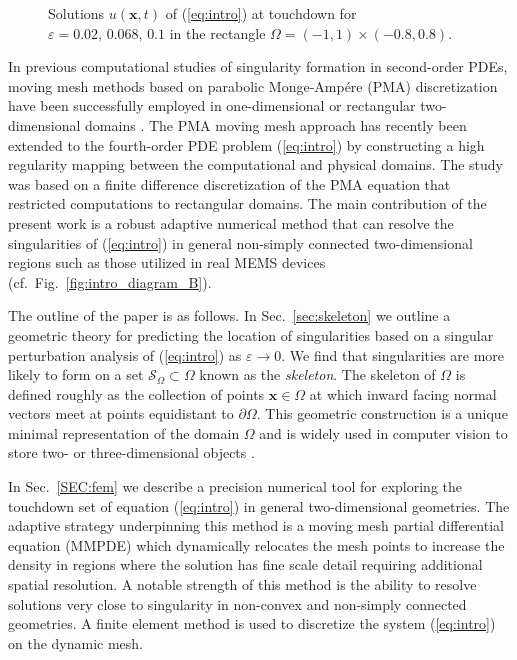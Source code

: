 \documentclass{siamart0516}
\renewcommand{\eqref}[1]{(\ref{#1})}
\newcommand{\eps}{\varepsilon}
\newcommand{\bx}{\mathbf{x}}
\newcommand{\skel}{\mathcal{S}_{\Omega}}
\theoremstyle{plain}%
\theoremstyle{definition}
\theoremstyle{remark}
\begin{document}
 \begin{figure}[htbp]
\centering
\subfigure[$\eps= 0.02$.]{\texttt{[image: rectu1.pdf]} \label{fig:introsol_a}}\quad
\subfigure[$\eps= 0.068$.]{\texttt{[image: rectu2.pdf]} \label{fig:introsol_b}}\quad
\subfigure[$\eps= 0.1$.]{\texttt{[image: rectu3.pdf]} \label{fig:introsol_c}}
\caption{Solutions $u(\bx,t)$ of \eqref{eq:intro} at touchdown for $\eps = 0.02,\, 0.068,\, 0.1$ in the rectangle $\Omega = (-1,1)\times(-0.8,0.8)$. \label{fig:introsol}}
\end{figure}

In previous computational studies of singularity formation in second-order PDEs, moving mesh methods based on parabolic Monge-Amp\'{e}re (PMA) discretization have been successfully employed in one-dimensional \cite{Budd2010} or rectangular two-dimensional domains \cite{Budd2006,Ceniceros2001,PMA2009}. The PMA moving mesh approach has recently \cite{LD2017} been extended to the fourth-order PDE problem \eqref{eq:intro} by constructing a high regularity mapping between the computational and physical domains. The study \cite{LD2017} was based on a finite difference discretization of the PMA equation that restricted computations to rectangular domains. The main contribution of the present work is a robust adaptive numerical method that can resolve the singularities of \eqref{eq:intro} in general non-simply connected two-dimensional regions such as those utilized in real MEMS devices (cf.~Fig.~\ref{fig:intro_diagram_B}).

The outline of the paper is as follows. In Sec.~\ref{sec:skeleton} we outline a geometric theory for predicting the location of singularities based on a singular perturbation analysis of \eqref{eq:intro} as $\eps\to0$. We find that singularities are more likely to form on a set $\skel\subset\Omega$ known as the \emph{skeleton}. The skeleton of $\Omega$ is defined roughly as the collection of points $\bx\in\Omega$ at which inward facing normal vectors meet at points equidistant to $\partial\Omega$. This geometric construction is a unique minimal  representation of the domain $\Omega$ and is widely used in computer vision to store two- or three-dimensional objects \cite{Malandain1998}.

In Sec.~\ref{SEC:fem} we describe a precision numerical tool for exploring the touchdown set of equation \eqref{eq:intro} in general two-dimensional geometries. The adaptive strategy underpinning this method is a moving mesh partial differential equation (MMPDE) which dynamically relocates the mesh points to increase the density in regions where the solution has fine scale detail requiring additional spatial resolution. A notable strength of this method is the ability to resolve solutions very close to singularity in non-convex and non-simply connected geometries. A finite element method is used to discretize the system \eqref{eq:intro} on the dynamic mesh.
\end{document}
